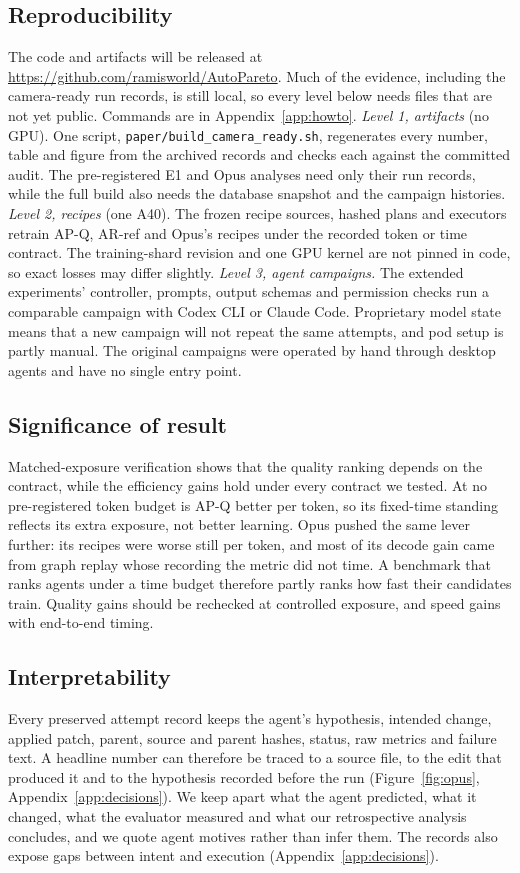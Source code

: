 \documentclass{article}
\newif\ifshowhumanmarkers \showhumanmarkersfalse
\newcommand{\humantag}[1]{{\color{humanframe}\sffamily\scriptsize\bfseries HUMAN AUTHOR MUST REWRITE/VERIFY [#1]}\ }
\newcommand{\humanauthor}[2][]{\ifshowhumanmarkers\begin{humanbox}\humantag{#1}#2\end{humanbox}\else #2\par\fi}
\begin{document}
\subsection{Reproducibility}\label{sec:reproduce}
\humanauthor[P2-17 r6]{The code and artifacts will be released at \url{https://github.com/ramisworld/AutoPareto}. Much of the evidence, including the camera-ready run records, is still local, so every level below needs files that are not yet public. Commands are in Appendix~\ref{app:howto}. \emph{Level 1, artifacts} (no GPU). One script, \texttt{paper/build\_camera\_ready.sh}, regenerates every number, table and figure from the archived records and checks each against the committed audit. The pre-registered E1 and Opus analyses need only their run records, while the full build also needs the database snapshot and the campaign histories. \emph{Level 2, recipes} (one A40). The frozen recipe sources, hashed plans and executors retrain AP-Q, AR-ref and Opus's recipes under the recorded token or time contract. The training-shard revision and one GPU kernel are not pinned in code, so exact losses may differ slightly. \emph{Level 3, agent campaigns.} The extended experiments' controller, prompts, output schemas and permission checks run a comparable campaign with Codex CLI or Claude Code. Proprietary model state means that a new campaign will not repeat the same attempts, and pod setup is partly manual. The original campaigns were operated by hand through desktop agents and have no single entry point.}

\subsection{Significance of result}
\humanauthor[P2-12 r6]{Matched-exposure verification shows that the quality ranking depends on the contract, while the efficiency gains hold under every contract we tested. At no pre-registered token budget is AP-Q better per token, so its fixed-time standing reflects its extra exposure, not better learning. Opus pushed the same lever further: its recipes were worse still per token, and most of its decode gain came from graph replay whose recording the metric did not time. A benchmark that ranks agents under a time budget therefore partly ranks how fast their candidates train. Quality gains should be rechecked at controlled exposure, and speed gains with end-to-end timing.}

\subsection{Interpretability}
\humanauthor[P2-13 r6]{Every preserved attempt record keeps the agent's hypothesis, intended change, applied patch, parent, source and parent hashes, status, raw metrics and failure text. A headline number can therefore be traced to a source file, to the edit that produced it and to the hypothesis recorded before the run (Figure~\ref{fig:opus}, Appendix~\ref{app:decisions}). We keep apart what the agent predicted, what it changed, what the evaluator measured and what our retrospective analysis concludes, and we quote agent motives rather than infer them. The records also expose gaps between intent and execution (Appendix~\ref{app:decisions}).}
\end{document}
